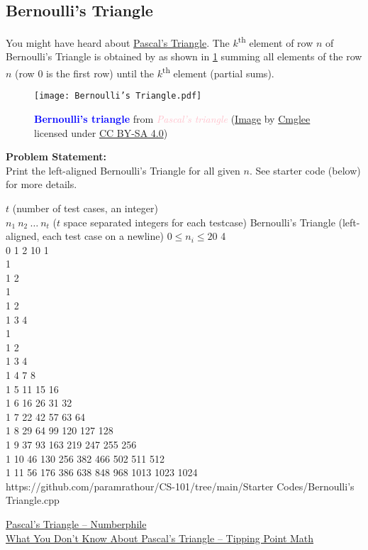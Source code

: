 \documentclass[../../Problems]{subfiles}
\begin{document}
\subsection{Bernoulli's Triangle}{\label{pp:bernoullistriangle}}
You might have heard about \href{https://youtu.be/0iMtlus-afo}{Pascal's Triangle}. 
The $k$\textsuperscript{th} element of row $n$ of Bernoulli's Triangle is obtained by as shown in \ref{fig:bernoullistriangle} summing all elements of the row $n$ (row $0$ is the first row) until the $k$\textsuperscript{th} element (partial sums).
\begin{figure}[H]
	\centering
	\texttt{[image: Bernoulli's Triangle.pdf]}
	\caption{\textbf{\textcolor{blue}{Bernoulli's triangle}} from \textit{\textcolor{pink}{Pascal's triangle}} (\href{https://bit.ly/bernoullis-triangle}{Image} by \href{https://commons.wikimedia.org/wiki/User:Cmglee}{Cmglee} licensed under \href{https://creativecommons.org/licenses/by-sa/4.0/}{CC BY-SA 4.0})}
	\label{fig:bernoullistriangle}
\end{figure}
\vspace{-1.5em}
\textbf{Problem Statement:}\\
Print the left-aligned Bernoulli's Triangle for all given $n$. See starter code (below) for more details.
\begin{testcases}
	{$t$ \hfill(number of test cases, an integer)\\$n_1\ n_2\ \ldots\ n_t$ \hfill($t$ space separated integers for each testcase)}
	{Bernoulli's Triangle \hfill(left-aligned, each test case on a newline)}
	{$0 \leq n_i \leq 20$}
	{4\\0 1 2 10}
	{1\\[1em]1\\1 2\\[1em]1\\1 2\\1 3 4\\[1em]1\\1 2\\1 3 4\\1 4 7 8\\1 5 11 15 16\\1 6 16 26 31 32\\1 7 22 42 57 63 64\\1 8 29 64 99 120 127 128\\1 9 37 93 163 219 247 255 256\\1 10 46 130 256 382 466 502 511 512\\1 11 56 176 386 638 848 968 1013 1023 1024}
	{https://github.com/paramrathour/CS-101/tree/main/Starter Codes/Bernoulli's Triangle.cpp}
\end{testcases}
\begin{funvideo}
\href{https://youtu.be/0iMtlus-afo}{Pascal's Triangle -- Numberphile}\\
\href{https://youtu.be/J0I1NuxUcpQ}{What You Don't Know About Pascal's Triangle -- Tipping Point Math}
\end{funvideo}
\end{document}
